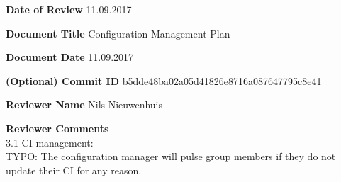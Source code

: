 \documentclass{report}
\begin{document}
    \textbf{Date of Review}
    11.09.2017
    
    \textbf{Document Title}
    Configuration Management Plan
    
    \textbf{Document Date}
    11.09.2017
    
    \textbf{(Optional) Commit ID}
    b5dde48ba02a05d41826e8716a087647795c8e41
    
    \textbf{Reviewer Name}
    Nils Nieuwenhuis
    
    
    \textbf{Reviewer Comments} \\
    3.1 CI management: \\
    TYPO: The configuration manager will {\color{red}pulse} group members if they do not update their CI for any reason.
    
\end{document}
